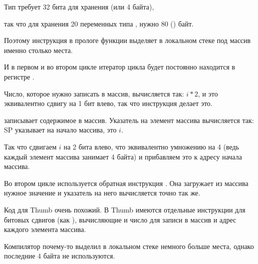 
\subsubsectionold{\NonOptimizingKeilVI (\ARMMode)}



Тип \Tint требует 32 бита для хранения (или 4 байта),

так что для хранения 20 переменных типа \Tint, нужно 80 () байт.

Поэтому инструкция  
в прологе функции выделяет в локальном стеке под массив именно столько места.

И в первом и во втором цикле итератор цикла  будет постоянно находится в регистре .

Число, которое нужно записать в массив, вычисляется так: $i*2$, и это эквивалентно 
сдвигу на 1 бит влево, так что инструкция  делает это.

 записывает содержимое  в массив.
Указатель на элемент массива вычисляется так: \ac{SP} указывает на начало массива,  это $i$.

Так что сдвигаем $i$ на 2 бита влево, что эквивалентно умножению на 4 
(ведь каждый элемент массива занимает 4 байта) и прибавляем это к адресу начала массива.

Во втором цикле используется обратная инструкция .
Она загружает из массива нужное значение и указатель на него вычисляется точно так же.

\subsubsectionold{\OptimizingKeilVI (\ThumbMode)}



Код для Thumb очень похожий.
В Thumb имеются отдельные инструкции для битовых сдвигов (как ), 
вычисляющие и число для записи в массив и адрес каждого элемента массива.

Компилятор почему-то выделил в локальном стеке немного больше места, 
однако последние 4 байта не используются.




